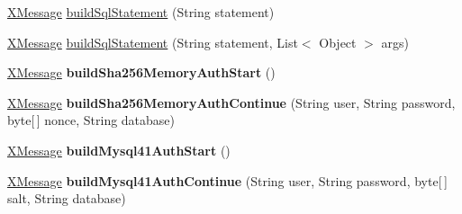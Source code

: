 \begin{DoxyCompactItemize}
\item 
\mbox{\hyperlink{classcom_1_1mysql_1_1cj_1_1protocol_1_1x_1_1_x_message}{X\+Message}} \mbox{\hyperlink{classcom_1_1mysql_1_1cj_1_1protocol_1_1x_1_1_x_message_builder_a60e482092bcdce0fd60ecd466daed306}{build\+Sql\+Statement}} (String statement)
\item 
\mbox{\hyperlink{classcom_1_1mysql_1_1cj_1_1protocol_1_1x_1_1_x_message}{X\+Message}} \mbox{\hyperlink{classcom_1_1mysql_1_1cj_1_1protocol_1_1x_1_1_x_message_builder_a2c3993eeb6a20211b7a81f15784fb537}{build\+Sql\+Statement}} (String statement, List$<$ Object $>$ args)
\item 
\mbox{\label{classcom_1_1mysql_1_1cj_1_1protocol_1_1x_1_1_x_message_builder_abff8c32a0e149ac708648441a53e160f}} 
\mbox{\hyperlink{classcom_1_1mysql_1_1cj_1_1protocol_1_1x_1_1_x_message}{X\+Message}} {\bfseries build\+Sha256\+Memory\+Auth\+Start} ()
\item 
\mbox{\label{classcom_1_1mysql_1_1cj_1_1protocol_1_1x_1_1_x_message_builder_a590a0e110a2f72f252fcf4ef7c528a4f}} 
\mbox{\hyperlink{classcom_1_1mysql_1_1cj_1_1protocol_1_1x_1_1_x_message}{X\+Message}} {\bfseries build\+Sha256\+Memory\+Auth\+Continue} (String user, String password, byte\mbox{[}$\,$\mbox{]} nonce, String database)
\item 
\mbox{\label{classcom_1_1mysql_1_1cj_1_1protocol_1_1x_1_1_x_message_builder_a57de6765909deabbc8dc2ed1fd6a4c57}} 
\mbox{\hyperlink{classcom_1_1mysql_1_1cj_1_1protocol_1_1x_1_1_x_message}{X\+Message}} {\bfseries build\+Mysql41\+Auth\+Start} ()
\item 
\mbox{\label{classcom_1_1mysql_1_1cj_1_1protocol_1_1x_1_1_x_message_builder_ac2db2e94fe80fb5b661a8cf05303487c}} 
\mbox{\hyperlink{classcom_1_1mysql_1_1cj_1_1protocol_1_1x_1_1_x_message}{X\+Message}} {\bfseries build\+Mysql41\+Auth\+Continue} (String user, String password, byte\mbox{[}$\,$\mbox{]} salt, String database)
\item 
\mbox{\label{classcom_1_1mysql_1_1cj_1_1protocol_1_1x_1_1_x_message_builder_af517dd056ab2ea661d42df011f60fd1e}} 

\end{DoxyCompactItemize}
